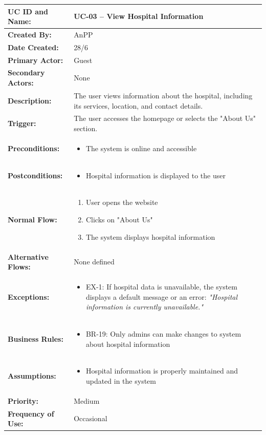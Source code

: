 \documentclass[12pt,a4paper]{article}
\begin{document}
\renewcommand{\arraystretch}{1.5}
\begin{longtable}{|p{4.5cm}|p{10.5cm}|}
\hline
\textbf{UC ID and Name:} & UC-03 – View Hospital Information \\
\hline
\textbf{Created By:} & AnPP \\
\hline
\textbf{Date Created:} & 28/6 \\
\hline
\textbf{Primary Actor:} & Guest \\
\hline
\textbf{Secondary Actors:} & None \\
\hline
\textbf{Description:} & The user views information about the hospital, including its services, location, and contact details. \\
\hline
\textbf{Trigger:} & The user accesses the homepage or selects the "About Us" section. \\
\hline
\textbf{Preconditions:} &
\begin{itemize}
  \item The system is online and accessible
\end{itemize} \\
\hline
\textbf{Postconditions:} &
\begin{itemize}
  \item Hospital information is displayed to the user
\end{itemize} \\
\hline
\textbf{Normal Flow:} &
\begin{enumerate}
  \item User opens the website
  \item Clicks on "About Us"
  \item The system displays hospital information
\end{enumerate} \\
\hline
\textbf{Alternative Flows:} & None defined \\
\hline
\textbf{Exceptions:} &
\begin{itemize}
  \item EX-1: If hospital data is unavailable, the system displays a default message or an error: \textit{"Hospital information is currently unavailable."}
\end{itemize} \\
\hline
\textbf{Business Rules:} &
\begin{itemize}
  \item BR-19: Only admins can make changes to system about hospital information
\end{itemize} \\
\hline
\textbf{Assumptions:} &
\begin{itemize}
  \item Hospital information is properly maintained and updated in the system
\end{itemize} \\
\hline
\textbf{Priority:} & Medium \\
\hline
\textbf{Frequency of Use:} & Occasional \\
\hline
\end{longtable}
\end{document}
